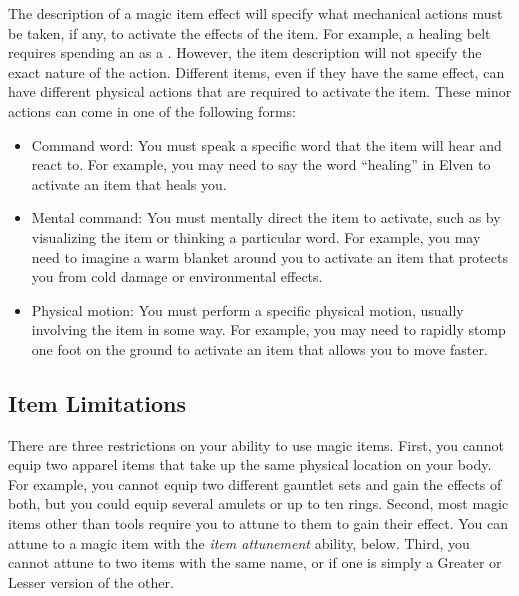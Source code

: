         The description of a magic item effect will specify what mechanical actions must be taken, if any, to activate the effects of the item.
        For example, a healing belt requires spending an  as a .
        However, the item description will not specify the exact nature of the action.
        Different items, even if they have the same effect, can have different physical actions that are required to activate the item.
        These minor actions can come in one of the following forms:
        \begin{itemize}
           \item Command word: You must speak a specific word that the item will hear and react to.
                For example, you may need to say the word ``healing'' in Elven to activate an item that heals you.
            \item Mental command: You must mentally direct the item to activate, such as by visualizing the item or thinking a particular word.
                For example, you may need to imagine a warm blanket around you to activate an item that protects you from cold damage or environmental effects.
            \item Physical motion: You must perform a specific physical motion, usually involving the item in some way.
                For example, you may need to rapidly stomp one foot on the ground to activate an item that allows you to move faster.
        \end{itemize}


    \subsection{Item Limitations}

        There are three restrictions on your ability to use magic items.
        First, you cannot equip two apparel items that take up the same physical location on your body.
        For example, you cannot equip two different gauntlet sets and gain the effects of both, but you could equip several amulets or up to ten rings.
        Second, most magic items other than tools require you to attune to them to gain their effect.
        You can attune to a magic item with the \textit{item attunement} ability, below.
        Third, you cannot attune to two items with the same name, or if one is simply a Greater or Lesser version of the other.

